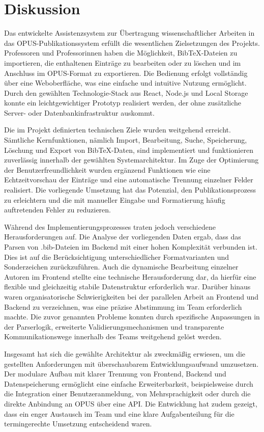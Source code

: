 \chapter{Diskussion}

Das entwickelte Assistenzsystem zur Übertragung wissenschaftlicher Arbeiten in das OPUS-Publikationssystem erfüllt die wesentlichen 
Zielsetzungen des Projekts. Professoren und Professorinnen haben die Möglichkeit, BibTeX-Dateien zu importieren, die enthaltenen 
Einträge zu bearbeiten oder zu löschen und im Anschluss im OPUS-Format zu exportieren. Die Bedienung erfolgt vollständig über 
eine Weboberfläche, was eine einfache und intuitive Nutzung ermöglicht. Durch den gewählten Technologie-Stack aus React, Node.js 
und Local Storage konnte ein leichtgewichtiger Prototyp realisiert werden, der ohne zusätzliche Server- oder Datenbankinfrastruktur 
auskommt.

Die im Projekt definierten technischen Ziele wurden weitgehend erreicht. Sämtliche Kernfunktionen, nämlich Import, Bearbeitung, 
Suche, Speicherung, Löschung und Export von BibTeX-Daten, sind implementiert und funktionieren zuverlässig innerhalb der gewählten 
Systemarchitektur. Im Zuge der Optimierung der Benutzerfreundlichkeit wurden ergänzend Funktionen wie eine Echtzeitvorschau der 
Einträge und eine automatische Trennung einzelner Felder realisiert. Die vorliegende Umsetzung hat das Potenzial, den 
Publikationsprozess zu erleichtern und die mit manueller Eingabe und Formatierung häufig auftretenden Fehler zu reduzieren.

Während des Implementierungsprozesses traten jedoch verschiedene Herausforderungen auf. Die Analyse der vorliegenden Daten ergab, 
dass das Parsen von .bib-Dateien im Backend mit einer hohen Komplexität verbunden ist. Dies ist auf die Berücksichtigung 
unterschiedlicher Formatvarianten und Sonderzeichen zurückzuführen. Auch die dynamische Bearbeitung einzelner Autoren im 
Frontend stellte eine technische Herausforderung dar, da hierfür eine flexible und gleichzeitig stabile Datenstruktur 
erforderlich war. Darüber hinaus waren organisatorische Schwierigkeiten bei der parallelen Arbeit an Frontend und 
Backend zu verzeichnen, was eine präzise Abstimmung im Team erforderlich machte. Die zuvor genannten Probleme konnten 
durch spezifische Anpassungen in der Parserlogik, erweiterte Validierungsmechanismen und transparente Kommunikationswege 
innerhalb des Teams weitgehend gelöst werden.

Insgesamt hat sich die gewählte Architektur als zweckmäßig erwiesen, um die gestellten Anforderungen mit überschaubarem 
Entwicklungsaufwand umzusetzen. Der modulare Aufbau mit klarer Trennung von Frontend, Backend und Datenspeicherung 
ermöglicht eine einfache Erweiterbarkeit, beispielsweise durch die Integration einer Benutzeranmeldung, 
von Mehrsprachigkeit oder durch die direkte Anbindung an OPUS über eine API. Die Entwicklung hat zudem gezeigt, 
dass ein enger Austausch im Team und eine klare Aufgabenteilung für die termingerechte Umsetzung entscheidend waren.

